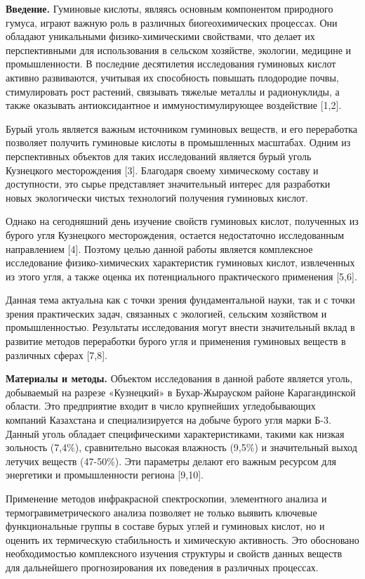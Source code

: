 \begin{multicols}{2}
{\bfseries Введение.} Гуминовые кислоты, являясь основным компонентом
природного гумуса, играют важную роль в различных биогеохимических
процессах. Они обладают уникальными физико-химическими свойствами, что
делает их перспективными для использования в сельском хозяйстве,
экологии, медицине и промышленности. В последние десятилетия
исследования гуминовых кислот активно развиваются, учитывая их
способность повышать плодородие почвы, стимулировать рост растений,
связывать тяжелые металлы и радионуклиды, а также оказывать
антиоксидантное и иммуностимулирующее воздействие {[}1,2{]}.

Бурый уголь является важным источником гуминовых веществ, и его
переработка позволяет получить гуминовые кислоты в промышленных
масштабах. Одним из перспективных объектов для таких исследований
является бурый уголь Кузнецкого месторождения {[}3{]}. Благодаря своему
химическому составу и доступности, это сырье представляет значительный
интерес для разработки новых экологически чистых технологий получения
гуминовых кислот.

Однако на сегодняшний день изучение свойств гуминовых кислот, полученных
из бурого угля Кузнецкого месторождения, остается недостаточно
исследованным направлением {[}4{]}. Поэтому целью данной работы является
комплексное исследование физико-химических характеристик гуминовых
кислот, извлеченных из этого угля, а также оценка их потенциального
практического применения {[}5,6{]}.

Данная тема актуальна как с точки зрения фундаментальной науки, так и с
точки зрения практических задач, связанных с экологией, сельским
хозяйством и промышленностью. Результаты исследования могут внести
значительный вклад в развитие методов переработки бурого угля и
применения гуминовых веществ в различных сферах {[}7,8{]}.

{\bfseries Материалы и методы.} Объектом исследования в данной работе
является уголь, добываемый на разрезе «Кузнецкий» в Бухар-Жырауском
районе Карагандинской области. Это предприятие входит в число крупнейших
угледобывающих компаний Казахстана и специализируется на добыче бурого
угля марки Б-3. Данный уголь обладает специфическими характеристиками,
такими как низкая зольность (7,4\%), сравнительно высокая влажность
(9,5\%) и значительный выход летучих веществ (47-50\%). Эти параметры
делают его важным ресурсом для энергетики и промышленности региона
{[}9,10{]}.

Применение методов инфракрасной спектроскопии, элементного анализа и
термогравиметрического анализа позволяет не только выявить ключевые
функциональные группы в составе бурых углей и гуминовых кислот, но и
оценить их термическую стабильность и химическую активность. Это
обосновано необходимостью комплексного изучения структуры и свойств
данных веществ для дальнейшего прогнозирования их поведения в различных
процессах.
\end{multicols}

